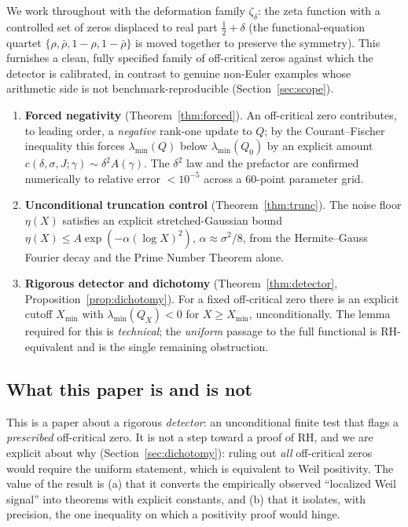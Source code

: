 \documentclass[11pt]{amsart}
\theoremstyle{definition}
\theoremstyle{remark}
\newcommand{\lmin}{\lambda_{\min}}
\newcommand{\Qzero}{Q_{0}}
\begin{document}
We work throughout with the deformation family $\zeta_\delta$: the zeta
function with a controlled set of zeros displaced to real part
$\tfrac12+\delta$ (the functional-equation quartet
$\{\rho,\bar\rho,1-\rho,1-\bar\rho\}$ is moved together to preserve the
symmetry). This furnishes a clean, fully specified family of off-critical
zeros against which the detector is calibrated, in contrast to genuine
non-Euler examples whose arithmetic side is not benchmark-reproducible
(Section~\ref{sec:scope}).

\begin{enumerate}[label=\textbf{(\Roman*)}]
\item \textbf{Forced negativity} (Theorem~\ref{thm:forced}). An off-critical
zero contributes, to leading order, a \emph{negative} rank-one update to
$Q$; by the Courant--Fischer inequality this forces $\lmin(Q)$ below
$\lmin(\Qzero)$ by an explicit amount $c(\delta,\sigma,J;\gamma)\sim
\delta^2 A(\gamma)$. The $\delta^2$ law and the prefactor are confirmed
numerically to relative error $<10^{-5}$ across a $60$-point parameter grid.
\item \textbf{Unconditional truncation control} (Theorem~\ref{thm:trunc}).
The noise floor $\eta(X)$ satisfies an explicit stretched-Gaussian bound
$\eta(X)\le A\exp(-\alpha(\log X)^2)$, $\alpha\approx\sigma^2/8$, from the
Hermite--Gauss Fourier decay and the Prime Number Theorem alone.
\item \textbf{Rigorous detector and dichotomy}
(Theorem~\ref{thm:detector}, Proposition~\ref{prop:dichotomy}). For a fixed
off-critical zero there is an explicit cutoff $X_{\min}$ with
$\lmin(Q_X)<0$ for $X\ge X_{\min}$, unconditionally. The lemma required for
this is \emph{technical}; the \emph{uniform} passage to the full functional
is RH-equivalent and is the single remaining obstruction.
\end{enumerate}

\subsection{What this paper is and is not}

This is a paper about a rigorous \emph{detector}: an unconditional finite
test that flags a \emph{prescribed} off-critical zero. It is not a step
toward a proof of RH, and we are explicit about why
(Section~\ref{sec:dichotomy}): ruling out \emph{all} off-critical zeros
would require the uniform statement, which is equivalent to Weil positivity.
The value of the result is (a) that it converts the empirically observed
``localized Weil signal'' into theorems with explicit constants, and (b)
that it isolates, with precision, the one inequality on which a positivity
proof would hinge.
\end{document}
